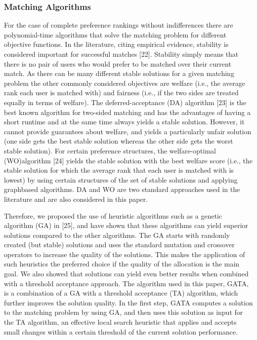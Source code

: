 \documentclass[a4paper,12pt]{article}
\begin{document}
	\subsubsection{Matching Algorithms}
For the case of complete preference rankings without
indifferences there are polynomial-time algorithms that
solve the matching problem for different objective functions. In the literature, citing empirical evidence, stability
is considered important for successful matches [22]. Stability simply means that there is no pair of users who
would prefer to be matched over their current match. As
there can be many different stable solutions for a given
matching problem the other commonly considered objectives are welfare (i.e., the average rank each user is
matched with) and fairness (i.e., if the two sides are
treated equally in terms of welfare). The deferred-acceptance (DA) algorithm [23] is the best known algorithm for
two-sided matching and has the advantages of having a
short runtime and at the same time always yields a stable solution. However, it cannot provide guarantees
about welfare, and yields a particularly unfair solution
(one side gets the best stable solution whereas the other
side gets the worst stable solution). For certain preference structures, the welfare-optimal (WO)algorithm [24]
yields the stable solution with the best welfare score (i.e.,
the stable solution for which the average rank that each
user is matched with is lowest) by using certain structures of the set of stable solutions and applying graphbased algorithms. DA and WO are two standard
approaches used in the literature and are also considered
in this paper.
	\par Therefore, we proposed the use of heuristic algorithms
such as a genetic algorithm (GA) in [25], and have shown
that these algorithms can yield superior solutions compared to the other algorithms. The GA starts with randomly created (but stable) solutions and uses the
standard mutation and crossover operators to increase
the quality of the solutions. This makes the application
of such heuristics the preferred choice if the quality of
the allocation is the main goal. We also showed that solutions can yield even better results when combined with
a threshold acceptance approach. The algorithm used in
this paper, GATA, is a combination of a GA with a
threshold acceptance (TA) algorithm, which further
improves the solution quality. In the first step, GATA
computes a solution to the matching problem by using
GA, and then uses this solution as input for the TA algorithm, an effective local search heuristic that applies and
accepts small changes within a certain threshold of the
current solution performance.
\end{document}
